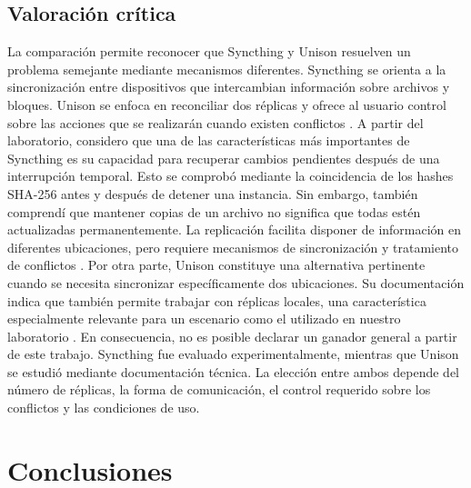 \documentclass[12pt,a4paper]{article}
\begin{document}
\subsection{Valoración crítica}

La comparación permite reconocer que Syncthing y Unison resuelven un problema semejante mediante mecanismos diferentes. Syncthing se orienta a la sincronización entre dispositivos que intercambian información sobre archivos y bloques. Unison se enfoca en reconciliar dos réplicas y 
ofrece al usuario control sobre las acciones que se realizarán cuando existen conflictos \cite{syncthingSyncing,unisonOfficial}.
A partir del laboratorio, considero que una de las características más importantes de Syncthing es su capacidad para recuperar cambios pendientes después de una interrupción temporal. 
Esto se comprobó mediante la coincidencia de los hashes SHA-256 antes y después de detener una instancia.
Sin embargo, también comprendí que mantener copias de un archivo no significa que todas estén actualizadas permanentemente. 
La replicación facilita disponer de información en diferentes ubicaciones, pero requiere mecanismos de sincronización y tratamiento de conflictos \cite{vansteen2023,ahmed2023}.
Por otra parte, Unison constituye una alternativa pertinente cuando se necesita sincronizar específicamente dos ubicaciones. 
Su documentación indica que también permite trabajar con réplicas locales, una característica especialmente relevante para un escenario como el utilizado en nuestro laboratorio \cite{unisonOfficial}.
En consecuencia, no es posible declarar un ganador general a partir de este trabajo. Syncthing fue evaluado experimentalmente, mientras que Unison se estudió mediante documentación técnica. 
La elección entre ambos depende del número de réplicas, la forma de comunicación, el control requerido sobre los conflictos y las condiciones de uso.

\section{Conclusiones}
\end{document}

